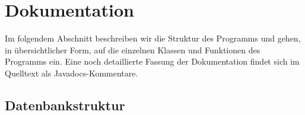 


\section{Dokumentation}

Im folgendem Abschnitt beschreiben wir die Struktur des Programms und gehen, in übersichtlicher Form, auf die einzelnen Klassen und Funktionen des Programms ein. Eine noch detaillierte Fassung der Dokumentation findet sich im Quelltext als Javadocs-Kommentare.

\subsection{Datenbankstruktur}

